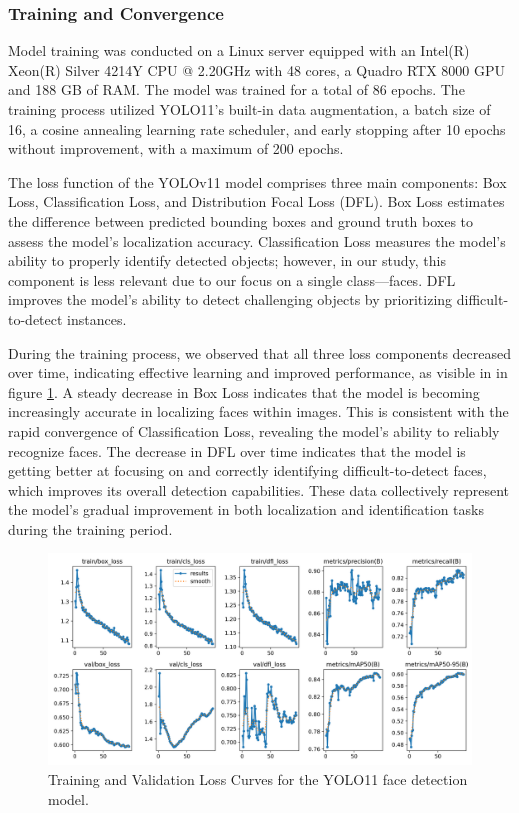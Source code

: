 \documentclass[
  man,floatsintext]{apa6}
\begin{document}
\subsubsection{Training and Convergence}\label{training-and-convergence}

Model training was conducted on a Linux server equipped with an Intel(R) Xeon(R) Silver 4214Y CPU @ 2.20GHz with 48 cores, a Quadro RTX 8000 GPU and 188 GB of RAM. The model was trained for a total of 86 epochs. The training process utilized YOLO11's built-in data augmentation, a batch size of 16, a cosine annealing learning rate scheduler, and early stopping after 10 epochs without improvement, with a maximum of 200 epochs.

The loss function of the YOLOv11 model comprises three main components: Box Loss, Classification Loss, and Distribution Focal Loss (DFL). Box Loss estimates the difference between predicted bounding boxes and ground truth boxes to assess the model's localization accuracy. Classification Loss measures the model's ability to properly identify detected objects; however, in our study, this component is less relevant due to our focus on a single class---faces. DFL improves the model's ability to detect challenging objects by prioritizing difficult-to-detect instances.

During the training process, we observed that all three loss components decreased over time, indicating effective learning and improved performance, as visible in in figure \ref{fig:face-loss-curves}. A steady decrease in Box Loss indicates that the model is becoming increasingly accurate in localizing faces within images. This is consistent with the rapid convergence of Classification Loss, revealing the model's ability to reliably recognize faces. The decrease in DFL over time indicates that the model is getting better at focusing on and correctly identifying difficult-to-detect faces, which improves its overall detection capabilities. These data collectively represent the model's gradual improvement in both localization and identification tasks during the training period.

\begin{figure}

{\centering \includegraphics[width=450px]{images/yolo_face_loss_curves} 

}

\caption{Training and Validation Loss Curves for the YOLO11 face detection model.}\label{fig:face-loss-curves}
\end{figure}
\end{document}
